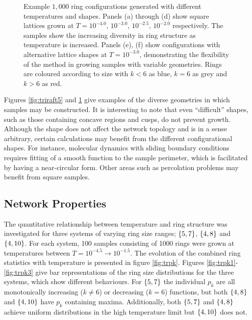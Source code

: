 \begin{figure}[h!]
\begin{subfigure}[b]{0.35\textwidth}
         \caption{}
         \label{fig:triraft6}
     \end{subfigure}
     
     \caption{Example $1,000$ ring configurations generated with different temperatures and shapes. Panels (a) through (d) show square lattices grown at $T=10^{-4.0},\,10^{-3.0},\,10^{-2.5},\, 10^{-2.0}$ respectively. The samples show the increasing diversity in ring structure as temperature is increased. Panels (e), (f) show configurations with alternative lattice shapes at $T=10^{-3.0}$, demonstrating the flexibility of the method in growing samples with variable geometries. Rings are coloured according to size with $k<6$ as blue, $k=6$ as grey and $k>6$ as red.}
     \label{fig:triraft}
\end{figure}

Figures \ref{fig:triraft5} and \ref{fig:triraft6} give examples of the diverse geometries in which samples may be constructed. 
It is interesting to note that even ``difficult'' shapes, such as those containing concave regions and cusps, do not prevent growth.  
Although the shape does not affect the network topology and is in a sense arbitrary, certain calculations may benefit from the different configurational shapes. 
For instance, molecular dynamics with sliding boundary conditions requires fitting of a smooth function to the sample perimeter, which is facilitated by having a near\--circular form.
Other areas such as percolation problems may benefit from square samples.

\subsection{Network Properties}

The quantitative relationship between temperature and ring structure was investigated for three systems of varying ring size ranges;  $\left\{5,7\right\}$, $\left\{4,8\right\}$ and $\left\{4,10\right\}$. 
For each system, 100 samples consisting of 1000 rings were grown at temperatures between $T=10^{-4.5}\rightarrow 10^{-1.5}$. 
The evolution of the combined ring statistics with temperature is presented in figure \ref{fig:trpk}. 
Figures \ref{fig:trpk1}\--\ref{fig:trpk3} give bar representations of the ring size distributions for the three systems, which show different behaviours. 
For $\left\{5,7\right\}$ the individual $p_k$ are all monotonically increasing ($k\neq 6$) or decreasing ($k=6$) functions, but both $\left\{4,8\right\}$ and $\left\{4,10\right\}$ have $p_k$ containing maxima. 
Additionally, both $\left\{5,7\right\}$ and $\left\{4,8\right\}$ achieve uniform distributions in the high temperature limit but $\left\{4,10\right\}$ does not. 

